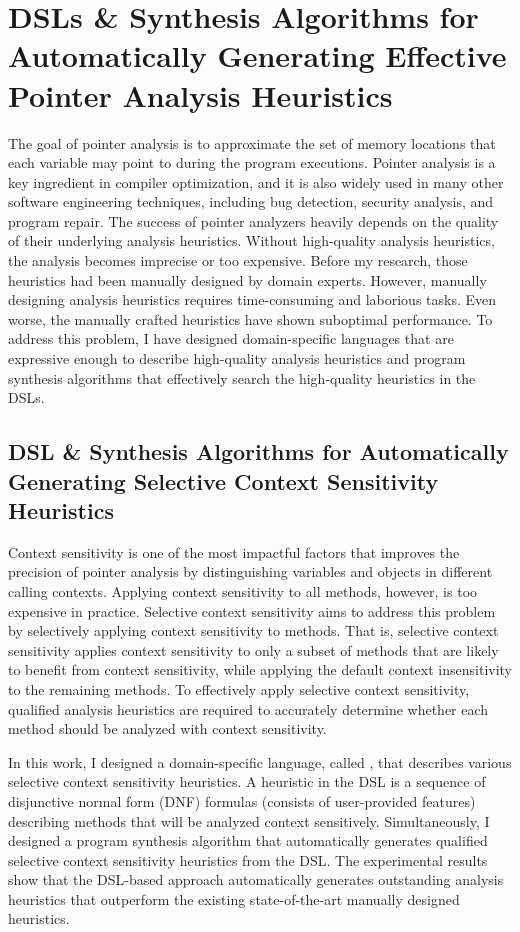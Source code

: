\documentclass[11pt]{article}
\begin{document}
\section{DSLs \& Synthesis Algorithms for Automatically Generating Effective Pointer Analysis Heuristics}
%
The goal of pointer analysis is to approximate the set of memory locations that each variable may point to during the program executions.
%
Pointer analysis is a key ingredient in compiler optimization, and it is also widely used in many other software engineering techniques, including bug detection, security analysis, and program repair.
%
The success of pointer analyzers heavily depends on the quality of their underlying analysis heuristics.
%
Without high-quality analysis heuristics, the analysis becomes imprecise or too expensive.
%
Before my research, those heuristics had been manually designed by domain experts. 
%
However, manually designing analysis heuristics requires time-consuming and laborious tasks.
%
Even worse, the manually crafted heuristics have shown suboptimal performance.
%
To address this problem, I have designed domain-specific languages that are expressive enough to describe high-quality analysis heuristics and program synthesis algorithms that effectively search the high-quality heuristics in the DSLs.



\subsection{DSL \& Synthesis Algorithms for Automatically Generating Selective Context Sensitivity Heuristics~\cite{JeJeChOh17,Jeon2019,IST2021}}
%
Context sensitivity is one of the most impactful factors that improves the precision of pointer analysis by distinguishing variables and objects in different calling contexts.
%
Applying context sensitivity to all methods, however, is too expensive in practice.
%
Selective context sensitivity aims to address this problem by selectively applying context sensitivity to methods.
%
That is, selective context sensitivity applies context sensitivity to only a subset of methods that are likely to benefit from context sensitivity, while applying the default context insensitivity to the remaining methods.
%
To effectively apply selective context sensitivity, qualified analysis heuristics are required to accurately determine whether each method should be analyzed with context sensitivity.




In this work, I designed a domain-specific language, called \DisjunctiveModel, that describes various selective context sensitivity heuristics.
%
A heuristic in the DSL is a sequence of disjunctive normal form (DNF) formulas (consists of user-provided features) describing methods that will be analyzed context sensitively.
%
Simultaneously, I designed a program synthesis algorithm that automatically generates qualified selective context sensitivity heuristics from the DSL.
%
The experimental results show that the DSL-based approach automatically generates outstanding analysis heuristics that outperform the existing state-of-the-art manually designed heuristics.
\end{document}
